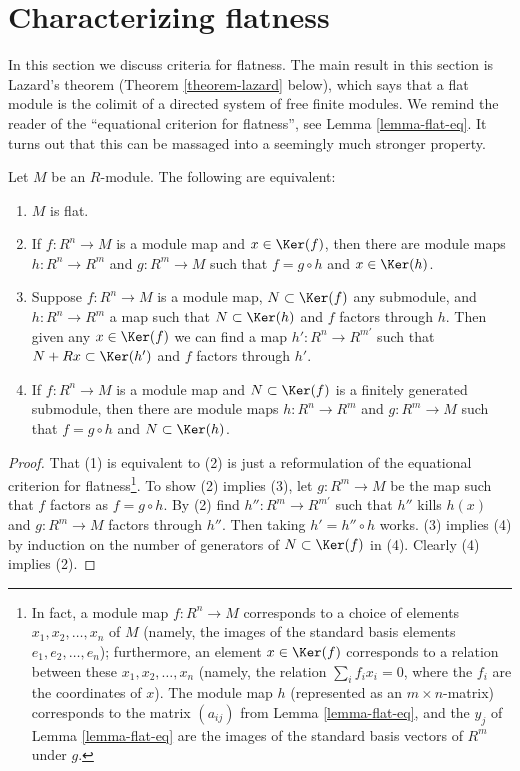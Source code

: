 \section{Characterizing flatness}
\label{section-characterize-flatness}

\noindent
In this section we discuss criteria for flatness. The main result in
this section is Lazard's theorem (Theorem \ref{theorem-lazard}
below), which says that a flat module is the colimit of a directed system of
free finite modules.
We remind the reader of the ``equational criterion for flatness'', see
Lemma \ref{lemma-flat-eq}.
It turns out that this can be massaged into a seemingly much stronger property.

\begin{lemma}
\label{lemma-flat-factors-free}
Let $M$ be an $R$-module.  The following are equivalent:
\begin{enumerate}
\item $M$ is flat.
\item If $f: R^n \to M$ is a module map and $x \in \Ker(f)$, then there
are module maps $h: R^n \to R^m$ and $g: R^m \to M$ such that
$f = g \circ h$ and $x \in \Ker(h)$.
\item Suppose $f: R^n \to M$ is a module map, $N \subset \Ker(f)$ any
submodule, and $h: R^n \to R^{m}$ a map such that $N \subset \Ker(h)$
and $f$ factors through $h$.  Then given any $x \in \Ker(f)$ we can find a map
$h': R^n \to R^{m'}$ such that $N + Rx \subset \Ker(h')$ and $f$
factors through $h'$.
\item If $f: R^n \to M$ is a module map and $N \subset \Ker(f)$ is a
finitely generated submodule, then there are module maps $h: R^n \to
R^m$ and $g: R^m \to M$ such that $f = g \circ h$ and $N \subset
\Ker(h)$.
\end{enumerate}
\end{lemma}

\begin{proof}
That (1) is equivalent to (2) is just a reformulation of the equational
criterion for flatness\footnote{In fact, a module map $f : R^n \to M$
corresponds to a choice of elements $x_1, x_2, \ldots, x_n$ of $M$
(namely, the images of the standard basis elements $e_1, e_2, \ldots,
e_n$); furthermore, an element $x \in \Ker(f)$ corresponds to a
relation between these $x_1, x_2, \ldots, x_n$ (namely, the relation
$\sum_i f_i x_i = 0$, where the $f_i$ are the coordinates of $x$).
The module map $h$ (represented as an $m \times n$-matrix)
corresponds to the matrix $(a_{ij})$ from Lemma \ref{lemma-flat-eq},
and the $y_j$ of Lemma \ref{lemma-flat-eq} are the images of the
standard basis vectors of $R^m$ under $g$.}.   To show
(2) implies (3), let $g: R^m \to M$
be the map such that $f$ factors as $f = g \circ h$.  By (2) find $h'': R^m
\to R^{m'}$ such that $h''$ kills $h(x)$ and $g: R^m \to M$
factors through $h''$.  Then taking $h' = h'' \circ h$ works.  (3) implies (4)
by induction on the number of generators of $N \subset \Ker(f)$ in (4).
Clearly (4) implies (2).
\end{proof}

